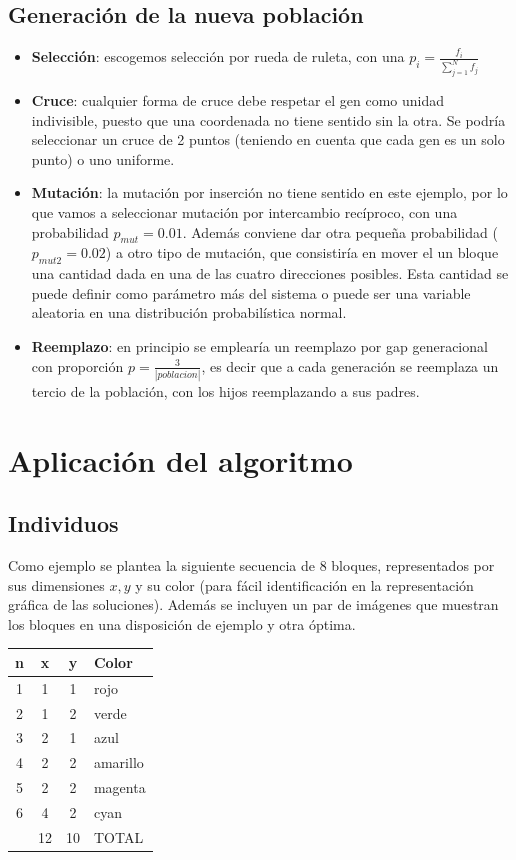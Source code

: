 \documentclass[a4paper]{article}
\begin{document}
\subsection{Generación de la nueva población}
\begin{itemize}
\item \textbf{Selección}: escogemos selección por rueda de ruleta, con una $p_i = \frac{f_i}{\sum_{j=1}^N f_j}$

\item \textbf{Cruce}: cualquier forma de cruce debe respetar el gen como unidad indivisible, puesto que una coordenada no tiene sentido sin la otra. Se podría seleccionar un cruce de 2 puntos (teniendo en cuenta que cada gen es un solo punto) o uno uniforme.

\item \textbf{Mutación}: la mutación por inserción no tiene sentido en este ejemplo, por lo que vamos a seleccionar mutación por intercambio recíproco, con una probabilidad $p_{mut}=0.01$. Además conviene dar otra pequeña probabilidad ($p_{mut2}=0.02$) a otro tipo de mutación, que consistiría en mover el un bloque una cantidad dada en una de las cuatro direcciones posibles. Esta cantidad se puede definir como parámetro más del sistema o puede ser una variable aleatoria en una distribución probabilística normal.

\item \textbf{Reemplazo}: en principio se emplearía un reemplazo por gap generacional con proporción $p=\frac{3}{\left|poblacion\right|}$, es decir que a cada generación se reemplaza un tercio de la población, con los hijos reemplazando a sus padres.
\end{itemize}

\section{Aplicación del algoritmo}
\subsection{Individuos}
Como ejemplo se plantea la siguiente secuencia de 8 bloques, representados por sus dimensiones $x,y$ y su color (para fácil identificación en la representación gráfica de las soluciones). Además se incluyen un par de imágenes que muestran los bloques en una disposición de ejemplo y otra óptima.

\begin{center}
\begin{tabular}{c|c|c|l}
n & x & y & Color \\ \hline
1 & 1 & 1 & rojo \\
2 & 1 & 2 & verde \\
3 & 2 & 1 & azul \\
4 & 2 & 2 & amarillo \\
5 & 2 & 2 & magenta \\
6 & 4 & 2 & cyan\\ \hline \hline
  & 12 & 10 & TOTAL \\
\end{tabular}
\end{center}
\end{document}
